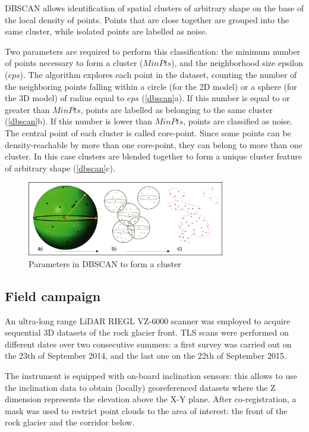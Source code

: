 \documentclass[
]{book}
\begin{document}
DBSCAN allows identification of spatial clusters of arbitrary shape on the base of the local density of points.
Points that are close together are grouped into the same cluster, while isolated points are labelled as noise.

Two parameters are required to perform this classification: the minimum number of points necessary to form a cluster (\(MinPts\)), and the neighborhood size epsilon (\(eps\)).
The algorithm explores each point in the dataset, counting the number of the neighboring points falling within a circle (for the 2D model) or a sphere (for the 3D model) of radius equal to \(eps\) (\autoref{dbscan}a).
If this number is equal to or greater than \(MinPts\), points are labelled as belonging to the same cluster (\autoref{dbscan}b).
If this number is lower than \(MinPts\), points are classified as noise.
The central point of each cluster is called core-point.
Since some points can be density-reachable by more than one core-point, they can belong to more than one cluster.
In this case clusters are blended together to form a unique cluster feature of arbitrary shape (\autoref{dbscan}c).

\begin{figure}

{\centering \includegraphics[width=3.4in]{images/parameters} 

}

\caption{Parameters in DBSCAN to form a cluster \label{dbscan}}\label{fig:fig2}
\end{figure}

\hypertarget{field-campaign}{%
\subsection{Field campaign}\label{field-campaign}}

An ultra-long range LiDAR RIEGL VZ-6000 scanner was employed to acquire sequential 3D datasets of the rock glacier front.
TLS scans were performed on different dates over two consecutive summers: a first survey was carried out on the 23th of September 2014, and the last one on the 22th of September 2015.

The instrument is equipped with on-board inclination sensors: this allows to use the inclination data to obtain (locally) georeferenced datasets where the Z dimension represents the elevation above the X-Y plane.
After co-registration, a mask was used to restrict point clouds to the area of interest: the front of the rock glacier and the corridor below.
\end{document}

